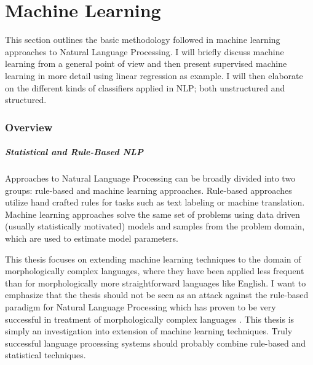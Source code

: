 \chapter{Machine Learning}

This section outlines the basic methodology followed in machine
learning approaches to Natural Language Processing. I will briefly
discuss machine learning from a general point of view and then present
supervised machine learning in more detail using linear regression as
example. I will then elaborate on the different kinds of classifiers
applied in NLP; both unstructured and structured.

\subsection{Overview}

\paragraph{Statistical and Rule-Based NLP}
Approaches to Natural Language Processing can be broadly divided into
two groups: rule-based and machine learning approaches. Rule-based
approaches utilize hand crafted rules for tasks such as text labeling
or machine translation. Machine learning approaches solve the same set
of problems using data driven (usually statistically motivated) models
and samples from the problem domain, which are used to estimate model
parameters.

This thesis focuses on extending machine learning techniques to the
domain of morphologically complex languages, where they have been
applied less frequent than for morphologically more straightforward
languages like English. I want to emphasize that the thesis should not
be seen as an attack against the rule-based paradigm for Natural
Language Processing which has proven to be very successful in
treatment of morphologically complex languages \cite{}. This thesis is
simply an investigation into extension of machine learning
techniques. Truly successful language processing systems should
probably combine rule-based and statistical techniques.


